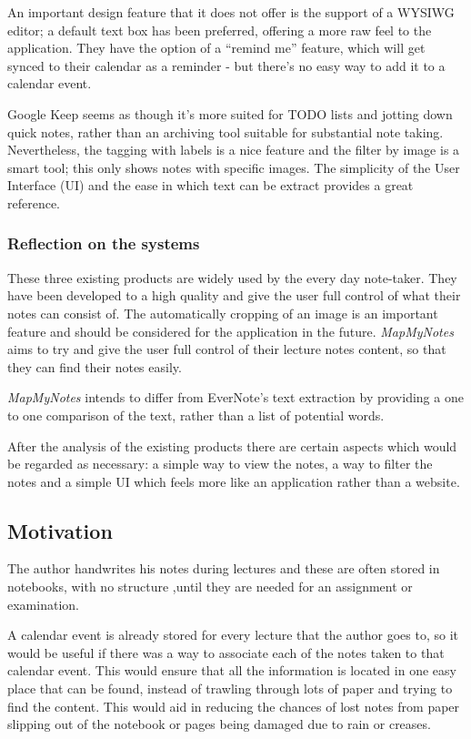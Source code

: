 An important design feature that it does not offer is the support of a WYSIWG editor; a default text box has been preferred, offering a more raw feel to the application. They have the option of a ``remind me'' feature, which will get synced to their calendar as a reminder - but there's no easy way to add it to a calendar event.

Google Keep seems as though it's more suited for TODO lists and jotting down quick notes, rather than an archiving tool suitable for substantial note taking. Nevertheless, the tagging with labels is a nice feature and the filter by image is a smart tool; this only shows notes with specific images. The simplicity of the User Interface (UI) and the ease in which text can be extract provides a great reference.

\subsubsection{Reflection on the systems}
These three existing products are widely used by the every day note-taker. They have been developed to a high quality and give the user full control of what their notes can consist of. The automatically cropping of an image is an important feature and should be considered  for the application in the future. \textit{MapMyNotes} aims to try and give the user full control of their lecture notes content, so that they can find their notes easily.

\textit{MapMyNotes} intends to differ from EverNote's text extraction by providing a one to one comparison of the text, rather than a list of potential words.

After the analysis of the existing products there are certain aspects which would be regarded as necessary: a simple way to view the notes, a way to filter the notes and a simple UI which feels more like an application rather than a website.


\subsection{Motivation}
The author handwrites his notes during lectures and these are often stored in notebooks, with no structure ,until they are needed for an assignment or examination.

A calendar event is already stored for every lecture that the author goes to, so it would be useful if there was a way to associate each of the notes taken to that calendar event. This would ensure that all the information is located in one easy place that can be found, instead of trawling through lots of paper and trying to find the content. This would aid in reducing the chances of lost notes from paper slipping out of the notebook or pages being damaged due to rain or creases.

